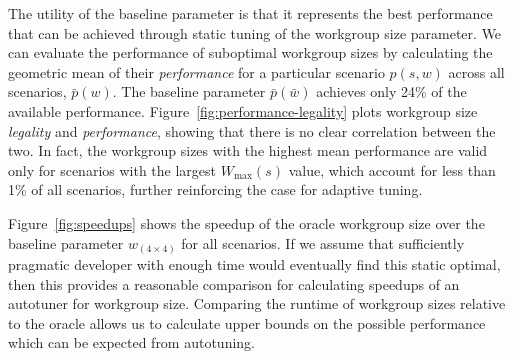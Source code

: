 \documentclass[nonatbib,preprint,10pt]{sigplanconf}
\begin{document}
The utility of the baseline parameter is that it represents the best
performance that can be achieved through static tuning of the
workgroup size parameter. We can evaluate the performance of
suboptimal workgroup sizes by calculating the geometric mean of their
\emph{performance} for a particular scenario $p(s, w)$ across all
scenarios, $\bar{p}(w)$. The baseline parameter $\bar{p}(\bar{w})$
achieves only 24\% of the available
performance. Figure~\ref{fig:performance-legality} plots workgroup
size \emph{legality} and \emph{performance}, showing that there is no
clear correlation between the two. In fact, the workgroup sizes with
the highest mean performance are valid only for scenarios with the
largest $W_{\max}(s)$ value, which account for less than 1\% of all
scenarios, further reinforcing the case for adaptive tuning.

Figure~\ref{fig:speedups} shows the speedup of the oracle workgroup
size over the baseline parameter $w_{(4 \times 4)}$ for all
scenarios. If we assume that sufficiently pragmatic developer with
enough time would eventually find this static optimal, then this
provides a reasonable comparison for calculating speedups of an
autotuner for workgroup size. Comparing the runtime of workgroup sizes
relative to the oracle allows us to calculate upper bounds on the
possible performance which can be expected from autotuning.


\end{document}
